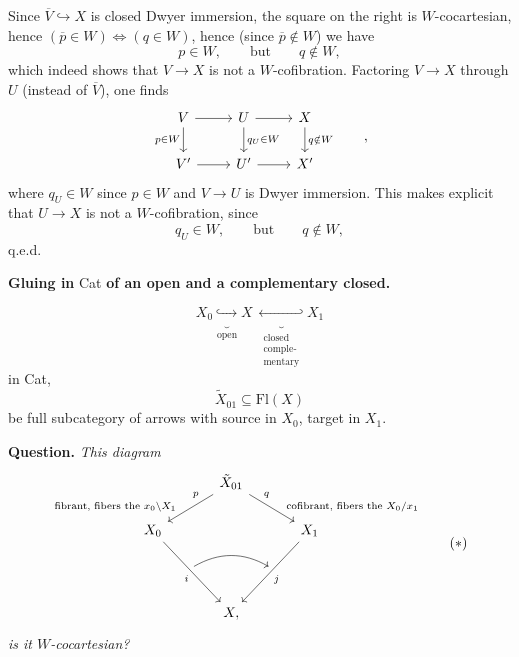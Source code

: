 Since $\overline{V} \hookrightarrow X$ is closed Dwyer immersion, the square on the right is $W$-cocartesian, hence $(\overline{p} \in W) \iff (q \in W)$, hence (since $\overline{p} \notin W$) we have
\[ p \in W, \qquad \text{but} \qquad q \notin W, \]
which indeed shows that $V \longrightarrow X$ is not a $W$-cofibration. Factoring $V \longrightarrow X$ through $U$ (instead of $\overline{V}$), one finds
\[
\begin{tikzcd}
V \arrow[r] \arrow[d, "p\in W"'] & U \arrow[r] \arrow[d, "q_U\in W"] & X \arrow[d, "q\notin W"] \\
V' \arrow[r] & U' \arrow[r] & X'
\end{tikzcd}
\qquad ,
\]
where $q_U \in W$ since $p \in W$ and $V \longrightarrow U$ is Dwyer immersion. This makes explicit that $U \longrightarrow X$ is not a $W$-cofibration, since
\[ q_U \in W, \qquad \text{but} \qquad q \notin W, \]
\hfill q.e.d.

\textbf{Gluing in} Cat \textbf{of an open and a complementary closed.}


\[ X_0 \underbrace{\hookrightarrow}_{\text{open}} X \ \underbrace{\hookleftarrow}_{\substack{\text{closed}\\ \text{comple-}\\ \text{mentary}}} X_1 \]
in Cat, 
\[ \tilde{X}_{01} \subseteq \mathrm{Fl}(X) \]
be full subcategory of arrows with source in $X_0$, target in $X_1$.

\textbf{Question.} \textit{This diagram}
\[
\begin{tikzcd}[column sep=small]
 & & \tilde{X}_{01} \arrow[dll, "p"' near start, "\text{fibrant, fibers the $x_0\backslash X_1$}"' near end] \arrow[drr, "q" near start, "\text{cofibrant, fibers the $X_0/x_1$}" near end] & & \\
X_0 \arrow[ddrr, "i"'] & & & & X_1 \arrow[ddll, "j"] \\
 & {} \arrow[rr, bend left] & & {} & \\
 & & X, & &
\end{tikzcd}
\tag*{$(*)$}
\]
\textit{is it $W$-cocartesian?}


